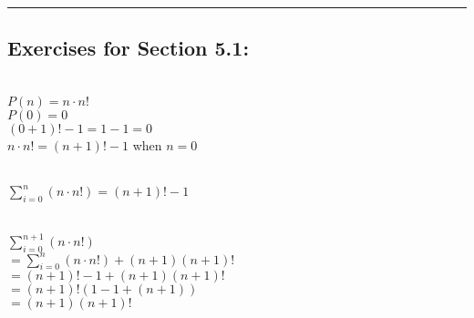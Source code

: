 \documentclass[12pt]{article}  %
\begin{document}
\rule{6in}{.1pt}       %


\subsection*{Exercises for Section 5.1:}     



\noindent\\
$P(n)=n\cdot n!$\\
$P(0)=0$\\
$(0+1)!-1=1-1=0$\\
$n\cdot n!=(n+1)!-1$ when $n=0$


\noindent\\
$\displaystyle\sum_{i=0}^{n}(n\cdot n!)=(n+1)!-1$


\noindent\\
$\displaystyle\sum_{i=0}^{n+1}(n\cdot n!)$\\
$\displaystyle=\sum_{i=0}^{n}(n\cdot n!)+(n+1)(n+1)!$\\
$=(n+1)!-1+(n+1)(n+1)!$\\
$=(n+1)!(1-1+(n+1))$\\
$=(n+1)(n+1)!$
\end{document}
